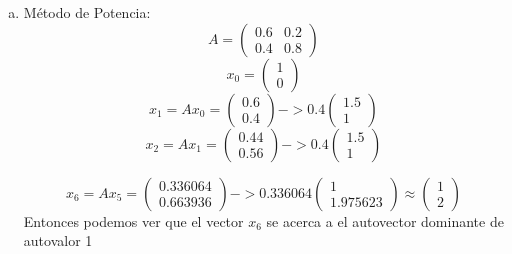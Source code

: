 \begin{frame}
    
\begin{solution}
     \begin{enumerate}[d)]
			\item
            Método de Potencia:
            \begin{equation*}
            A=\begin{pmatrix}0.6 & 0.2\\0.4 & 0.8 \end{pmatrix}   
         \end{equation*}
        \begin{equation*}
           x_{0}= \begin{pmatrix}1\\0 \end{pmatrix}
         \end{equation*}
         \begin{equation*}
           x_{1}=Ax_{0}= \begin{pmatrix}0.6\\0.4 \end{pmatrix}->0.4\begin{pmatrix}1.5\\1 \end{pmatrix}
         \end{equation*}
         \begin{equation*}
           x_{2}=Ax_{1}= \begin{pmatrix}0.44\\0.56 \end{pmatrix}->0.4\begin{pmatrix}1.5\\1 \end{pmatrix}
         \end{equation*}
         
         \begin{equation*}
           x_{6}=Ax_{5}= \begin{pmatrix}0.336064\\0.663936 \end{pmatrix}->0.336064\begin{pmatrix}1\\1.975623 \end{pmatrix} \approx \begin{pmatrix}1\\2 \end{pmatrix}
         \end{equation*}
		Entonces podemos ver que el vector $x_{6}$ se acerca a el autovector dominante de autovalor 1 
		\end{enumerate}
\end{solution}
\end{frame}
  